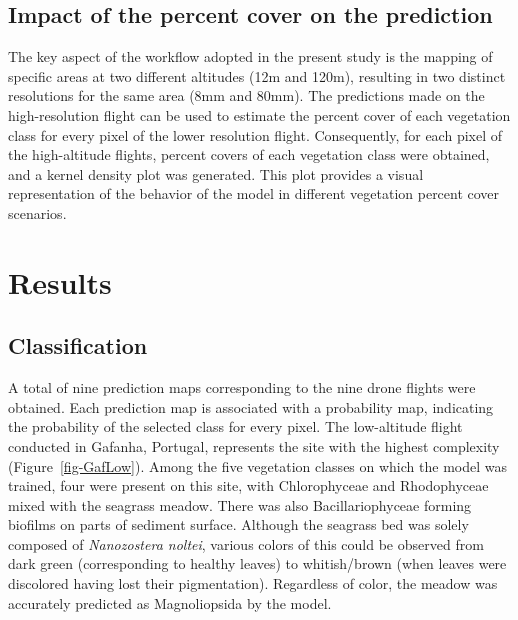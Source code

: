 \documentclass[
  number]{elsarticle}
\begin{document}
\subsection{Impact of the percent cover on the
prediction}\label{impact-of-the-percent-cover-on-the-prediction}

The key aspect of the workflow adopted in the present study is the
mapping of specific areas at two different altitudes (12m and 120m),
resulting in two distinct resolutions for the same area (8mm and 80mm).
The predictions made on the high-resolution flight can be used to
estimate the percent cover of each vegetation class for every pixel of
the lower resolution flight. Consequently, for each pixel of the
high-altitude flights, percent covers of each vegetation class were
obtained, and a kernel density plot was generated. This plot provides a
visual representation of the behavior of the model in different
vegetation percent cover scenarios.

\section{Results}\label{results}

\subsection{Classification}\label{classification}

A total of nine prediction maps corresponding to the nine drone flights
were obtained. Each prediction map is associated with a probability map,
indicating the probability of the selected class for every pixel. The
low-altitude flight conducted in Gafanha, Portugal, represents the site
with the highest complexity (Figure~\ref{fig-GafLow}). Among the five
vegetation classes on which the model was trained, four were present on
this site, with Chlorophyceae and Rhodophyceae mixed with the seagrass
meadow. There was also Bacillariophyceae forming biofilms on parts of
sediment surface. Although the seagrass bed was solely composed of
\emph{Nanozostera noltei}, various colors of this could be observed from
dark green (corresponding to healthy leaves) to whitish/brown (when
leaves were discolored having lost their pigmentation). Regardless of
color, the meadow was accurately predicted as Magnoliopsida by the
model.
\end{document}
